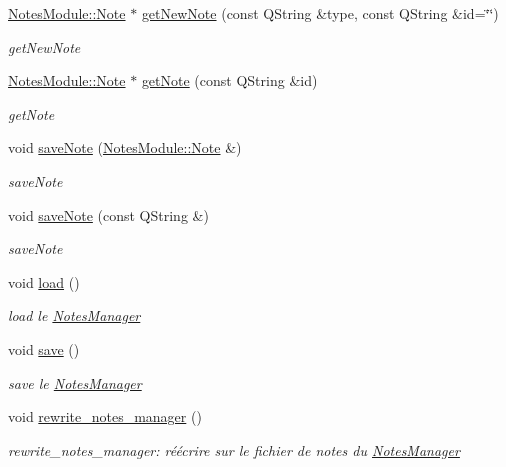 \begin{DoxyCompactItemize}
\item 
\hyperlink{class_notes_module_1_1_note}{Notes\-Module\-::\-Note} $\ast$ \hyperlink{classmanagers_1_1_notes_manager_af32da81cfeafa00a0d652fc0815bd95d}{get\-New\-Note} (const Q\-String \&type, const Q\-String \&id=\char`\"{}\char`\"{})
\begin{DoxyCompactList}\small\item\em get\-New\-Note \end{DoxyCompactList}\item 
\hyperlink{class_notes_module_1_1_note}{Notes\-Module\-::\-Note} $\ast$ \hyperlink{classmanagers_1_1_notes_manager_a3fccaef2b808f8cbd9193a73705d0546}{get\-Note} (const Q\-String \&id)
\begin{DoxyCompactList}\small\item\em get\-Note \end{DoxyCompactList}\item 
void \hyperlink{classmanagers_1_1_notes_manager_a55bb2850e292e56b59019135c61bfa12}{save\-Note} (\hyperlink{class_notes_module_1_1_note}{Notes\-Module\-::\-Note} \&)
\begin{DoxyCompactList}\small\item\em save\-Note \end{DoxyCompactList}\item 
void \hyperlink{classmanagers_1_1_notes_manager_a9eee9ff00cf54fe024fe2bdc17b68bcf}{save\-Note} (const Q\-String \&)
\begin{DoxyCompactList}\small\item\em save\-Note \end{DoxyCompactList}\item 
void \hyperlink{classmanagers_1_1_notes_manager_ad4fb2de50633dd25b71024343341cd64}{load} ()
\begin{DoxyCompactList}\small\item\em load le \hyperlink{classmanagers_1_1_notes_manager}{Notes\-Manager} \end{DoxyCompactList}\item 
void \hyperlink{classmanagers_1_1_notes_manager_aa75e4ec87b86f98478c93e00b14144ff}{save} ()
\begin{DoxyCompactList}\small\item\em save le \hyperlink{classmanagers_1_1_notes_manager}{Notes\-Manager} \end{DoxyCompactList}\item 
void \hyperlink{classmanagers_1_1_notes_manager_a9acb1f8e2ff4f42633923bd422b87b45}{rewrite\-\_\-notes\-\_\-manager} ()
\begin{DoxyCompactList}\small\item\em rewrite\-\_\-notes\-\_\-manager\-: réécrire sur le fichier de notes du \hyperlink{classmanagers_1_1_notes_manager}{Notes\-Manager} \end{DoxyCompactList}\item 

\end{DoxyCompactItemize}
